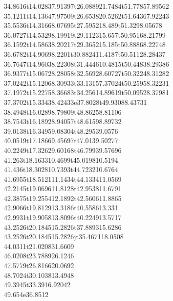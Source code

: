 \documentclass[draft]{article}
\begin{document}
{{34.8616}t{14.0283}{7.91397}t{26.0889}{21.7484}t{51.7785}{7.89562}\\%
{35.1211}t{14.1364}{7.97509}t{26.6538}{20.5262}t{51.6436}{7.92243}\\%
{35.5536}t{14.3166}{8.07695}t{27.5952}{18.489}t{51.329}{8.05678}\\%
{36.0727}t{14.5329}{8.19919}t{29.1123}{15.657}t{50.9516}{8.21799}\\%
{36.1592}t{14.5863}{8.20217}t{29.3652}{15.185}t{50.8886}{8.22748}\\%
{36.6782}t{14.9069}{8.2201}t{30.8824}{11.4187}t{50.5112}{8.28437}\\%
{36.7647}t{14.9603}{8.22308}t{31.4446}{10.4815}t{50.4483}{8.29386}\\%
{36.9377}t{15.0672}{8.28058}t{32.5692}{8.60727}t{50.3224}{8.31282}\\%
{37.0242}t{15.1206}{8.30933}t{33.1315}{7.37024}t{50.2595}{8.32231}\\%
{37.1972}t{15.2275}{8.36683}t{34.2561}{4.89619}t{50.0952}{8.37981}\\%
{37.3702}t{15.3343}{8.42433}e{37.8028}t{49.9308}{8.43731}\\%
{38.4948}t{16.0289}{8.79809}t{48.8625}{8.81106}\\%
{38.7543}t{16.1892}{8.94057}t{48.6159}{8.89732}\\%
{39.0138}t{16.3495}{9.08304}t{48.2953}{9.0576}\\%
{40.0519}t{17.1866}{9.45697}t{47.013}{9.50277}\\%
{40.2249}t{17.3262}{9.60168}t{46.7993}{9.57696}\\%
{41.263}t{18.1633}{10.4699}t{45.0198}{10.5194}\\%
{41.436}t{18.3028}{10.7393}t{44.7232}{10.6764}\\%
{41.6955}t{18.5121}{11.1434}t{44.1334}{11.0569}\\%
{42.2145}t{19.0696}{11.8128}t{42.9538}{11.6791}\\%
{42.3875}t{19.2554}{12.1892}t{42.5606}{11.8865}\\%
{42.9066}t{19.8129}{13.3186}t{40.5586}{13.331}\\%
{42.9931}t{19.9058}{13.8096}t{40.2249}{13.5717}\\%
{43.2526}t{20.1845}{15.2826}t{37.8893}{15.6286}\\%
{43.2526}t{20.1845}{15.2826}jt{35.4671}{18.0508}\\%
{44.0311}t{21.0208}{31.6609}\\%
{46.0208}t{23.7889}{26.1246}\\%
{47.5779}t{26.8166}{20.0692}\\%
{48.7024}t{30.1038}{13.4948}\\%
{49.3945}t{33.391}{6.92042}\\%
{49.654}e{36.8512}%
}
\end{document}
